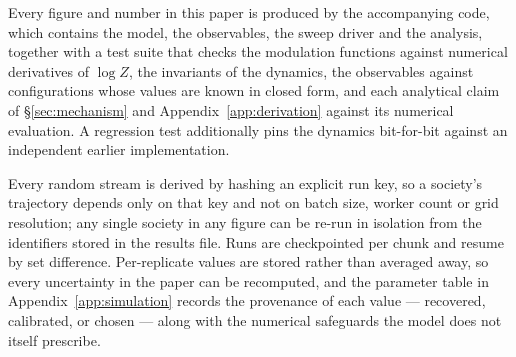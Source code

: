 Every figure and number in this paper is produced by the accompanying code,
which contains the model, the observables, the sweep driver and the analysis,
together with a test suite that checks the modulation functions against
numerical derivatives of $\log Z$, the invariants of the dynamics, the
observables against configurations whose values are known in closed form, and
each analytical claim of \S\ref{sec:mechanism} and Appendix~\ref{app:derivation}
against its numerical evaluation. A regression test additionally pins the
dynamics bit-for-bit against an independent earlier implementation.

Every random stream is derived by hashing an explicit run key, so a society's
trajectory depends only on that key and not on batch size, worker count or grid
resolution; any single society in any figure can be re-run in isolation from the
identifiers stored in the results file. Runs are checkpointed per chunk and
resume by set difference. Per-replicate values are stored rather than averaged
away, so every uncertainty in the paper can be recomputed, and the parameter
table in Appendix~\ref{app:simulation} records the provenance of each value ---
recovered, calibrated, or chosen --- along with the numerical safeguards the
model does not itself prescribe.
